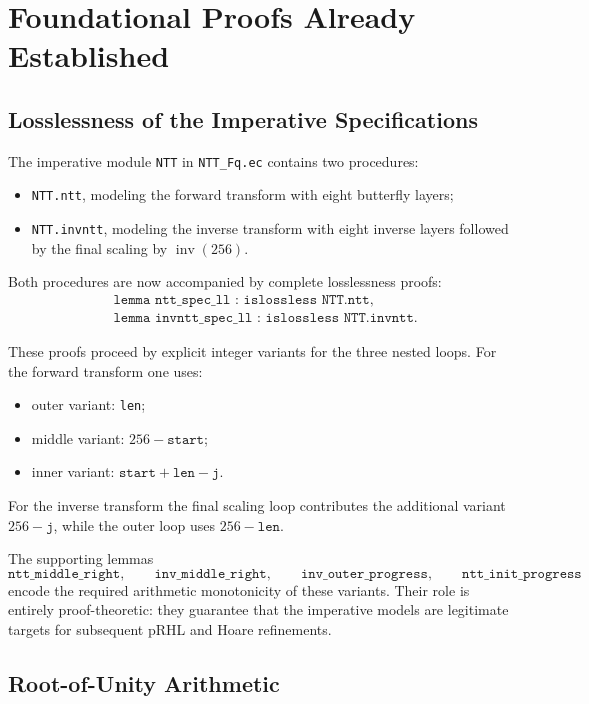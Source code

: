 \documentclass[11pt]{article}
\begin{document}
\section{Foundational Proofs Already Established}

\subsection{Losslessness of the Imperative Specifications}

The imperative module \texttt{NTT} in \texttt{NTT\_Fq.ec} contains two
procedures:
\begin{itemize}
\item \texttt{NTT.ntt}, modeling the forward transform with eight butterfly layers;
\item \texttt{NTT.invntt}, modeling the inverse transform with eight inverse layers followed by the final scaling by $\operatorname{inv}(256)$.
\end{itemize}

Both procedures are now accompanied by complete losslessness proofs:
\begin{align*}
&\texttt{lemma ntt\_spec\_ll : islossless NTT.ntt},\\
&\texttt{lemma invntt\_spec\_ll : islossless NTT.invntt}.
\end{align*}

These proofs proceed by explicit integer variants for the three nested loops.
For the forward transform one uses:
\begin{itemize}
\item outer variant: \texttt{len};
\item middle variant: $256 - \texttt{start}$;
\item inner variant: $\texttt{start} + \texttt{len} - \texttt{j}$.
\end{itemize}
For the inverse transform the final scaling loop contributes the additional
variant $256 - \texttt{j}$, while the outer loop uses $256 - \texttt{len}$.

The supporting lemmas
\[
\texttt{ntt\_middle\_right},\qquad
\texttt{inv\_middle\_right},\qquad
\texttt{inv\_outer\_progress},\qquad
\texttt{ntt\_init\_progress}
\]
encode the required arithmetic monotonicity of these variants. Their role is
entirely proof-theoretic: they guarantee that the imperative models are
legitimate targets for subsequent pRHL and Hoare refinements.

\subsection{Root-of-Unity Arithmetic}
\end{document}
